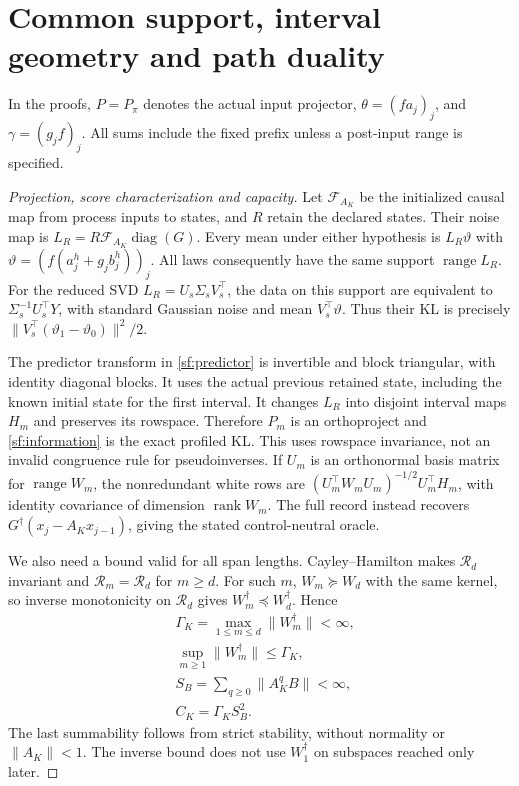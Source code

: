\documentclass[journal]{IEEEtran}
\begin{document}
\section{Common support, interval geometry and path duality}\label{sf:geometry}
In the proofs, $P=P_\pi$ denotes the actual input projector,
$\theta=(fa_j)_j$, and $\gamma=(g_jf)_j$. All sums include the fixed prefix
unless a post-input range is specified.
\begin{proof}[Projection, score characterization and capacity]\leavevmode
Let $\mathcal F_{A_K}$ be the initialized causal map from process
inputs to states, and $R$ retain the declared states. Their noise map is
$L_R=R\mathcal F_{A_K}\operatorname{diag}(G)$.
Every mean under either hypothesis is $L_R\vartheta$ with
$\vartheta=(f(a_j^h+g_jb_j^h))_j$. All laws consequently have the
same support $\operatorname{range}L_R$.
For the reduced SVD $L_R=U_s\Sigma_sV_s^\top$, the data on this support
are equivalent to $\Sigma_s^{-1}U_s^\top Y$, with standard Gaussian
noise and mean $V_s^\top\vartheta$. Thus their KL is precisely
$\|V_s^\top(\vartheta_1-\vartheta_0)\|^2/2$.

The predictor transform in \eqref{sf:predictor} is invertible and
block triangular, with identity diagonal blocks. It uses the actual previous
retained state, including the known initial state for the first interval.
It changes $L_R$ into disjoint interval maps $H_m$ and preserves its
rowspace. Therefore $P_m$ is an orthoproject and
\eqref{sf:information} is the exact profiled KL.
This uses rowspace invariance, not an invalid congruence rule for
pseudoinverses. If $U_m$ is an orthonormal basis matrix for $\operatorname{range}W_m$, the
nonredundant white rows are
$(U_m^\top W_mU_m)^{-1/2}U_m^\top H_m$, with identity covariance
of dimension $\operatorname{rank}W_m$.
The full record instead recovers
$G^\dagger(x_j-A_Kx_{j-1})$, giving the stated control-neutral oracle.

We also need a bound valid for all span lengths.
Cayley--Hamilton makes $\mathcal R_d$ invariant and
$\mathcal R_m=\mathcal R_d$ for $m\ge d$.
For such $m$, $W_m\succeq W_d$ with the same kernel, so inverse
monotonicity on $\mathcal R_d$ gives $W_m^\dagger\preceq W_d^\dagger$.
Hence
\begin{equation}\label{sf:gamma}
\begin{aligned}
&\Gamma_K=\max_{1\le m\le d}\|W_m^\dagger\|<\infty,\\
&\sup_{m\ge1}\|W_m^\dagger\|\le\Gamma_K,\\
&S_B=\sum_{q\ge0}\|A_K^qB\|<\infty,\\
&C_K=\Gamma_KS_B^2 .
\end{aligned}
\end{equation}
The last summability follows from strict stability, without normality
or $\|A_K\|<1$. The inverse bound does not use $W_1^\dagger$ on
subspaces reached only later.


\end{proof}
\end{document}
